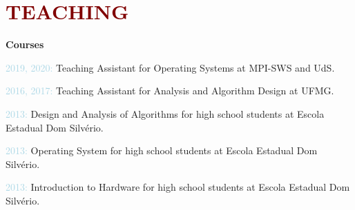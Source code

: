 \section*{\textcolor{maroon}{\normalsize TEACHING}} 

\textbf{Courses}

\begin{innerlist}[-]
    \item \textcolor{lightblue}{2019, 2020:} Teaching Assistant for Operating Systems at MPI-SWS and UdS.
    \item \textcolor{lightblue}{2016, 2017:} Teaching Assistant for Analysis and Algorithm Design at UFMG.
    \item \textcolor{lightblue}{2013:} Design and Analysis of Algorithms for high school students at Escola Estadual Dom Silvério.
    \item \textcolor{lightblue}{2013:} Operating System for high school students at Escola Estadual Dom Silvério.
    \item \textcolor{lightblue}{2013:} Introduction to Hardware for high school students at Escola Estadual Dom Silvério.

\end{innerlist}



